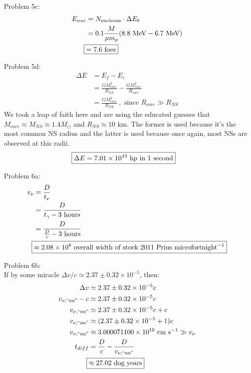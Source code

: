 \documentclass[10pt,letter,preprint]{aastex}
\begin{document}
Problem 5c:\\
\begin{align}
E_{nuc} &= N_{\textrm{nucleons}} \cdot \Delta E_{b}\\
&= 0.1 \frac{M}{\mu m_p} (8.8\textrm{ MeV} - 6.7 \textrm{ MeV})\\
\Aboxed{&= 7.6 \textrm{ foes}}%
\end{align}

Problem 5d:\\
\begin{align}
\Delta E &= E_f - E_i\\
&= \frac{GM_{core}^2}{R_{NS}} -  \frac{GM_{core}^2}{R_{core}}\\
& = \frac{GM_{core}^2}{R_{NS}} ~,\textrm{ since $R_{core} \gg R_{NS}$}
\end{align}
We took a leap of faith here and are using the educated guesses that $M_{core} \approx M_{NS} \approx 1.4M_\odot$ and $R_{NS} \approx 10$ km. The former is used because it's the most common NS radius and the latter is used because once again, most NSs are observed at this radii.
\begin{align}
\Aboxed{\Delta E &= 7.01 \times 10^{43} \textrm{ hp in 1 second}} %
\end{align}

Problem 6a:\\
\begin{align}
v_{\nu} &= \frac{D}{t_{\nu}}\\
&= \frac{D}{t_{\gamma}-3\textrm{ hours}}\\
&= \frac{D}{\frac{D}{c}-3\textrm{ hours}}\\ 
\Aboxed{ &\approx 2.08 \times 10^{8}\textrm{ overall width of stock 2011 Prius microfortnight}^{-1}}%
\end{align}

\newpage
Problem 6b:\\
If by some miracle $\Delta v/c \simeq 2.37 \pm 0.32 \times 10^{-5} $, then:
\begin{align}
\Delta v &\simeq  2.37 \pm 0.32 \times 10^{-5}  c\\
v_{\nu,\textrm{``nu''}}  - c &\simeq  2.37 \pm 0.32 \times 10^{-5}  c\\
v_{\nu,\textrm{``nu''}} &\simeq 2.37 \pm 0.32 \times 10^{-5}  c + c\\
v_{\nu,\textrm{``nu''}} &\simeq (2.37 \pm 0.32 \times 10^{-5}  + 1)c \\
v_{\nu,\textrm{``nu''}} &\approx 3.000071100 \times 10^{10}\textrm{ cm s}^{-1} \gg v_{\nu} \\
t_{diff} &= \frac{D}{c} - \frac{D}{v_{\nu,\textrm{``nu''}}} \\
\Aboxed{&\approx 27.02 \textrm{ dog years}}%
\end{align}
\end{document}
